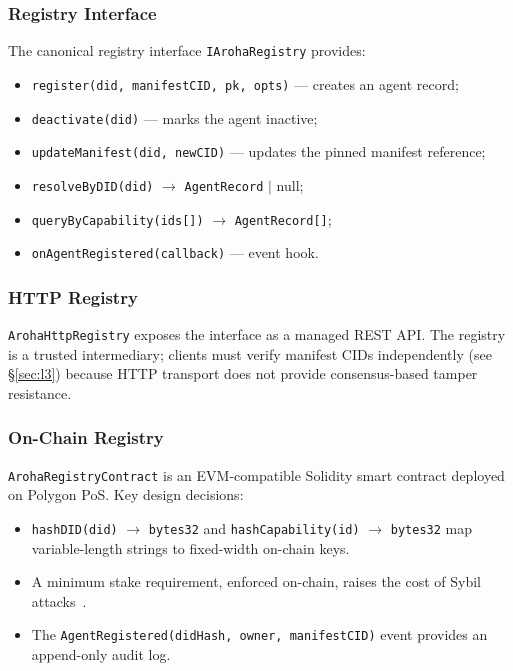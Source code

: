 \documentclass[conference]{IEEEtran}
\begin{document}
\subsubsection{Registry Interface}

The canonical registry interface \texttt{IArohaRegistry}
provides:
\begin{itemize}
  \item \texttt{register(did, manifestCID, pk, opts)} —
    creates an agent record;
  \item \texttt{deactivate(did)} — marks the agent inactive;
  \item \texttt{updateManifest(did, newCID)} — updates the
    pinned manifest reference;
  \item \texttt{resolveByDID(did)} $\to$ \texttt{AgentRecord}
    $\mid$ null;
  \item \texttt{queryByCapability(ids[])} $\to$
    \texttt{AgentRecord[]};
  \item \texttt{onAgentRegistered(callback)} — event hook.
\end{itemize}

\subsubsection{HTTP Registry}

\texttt{ArohaHttpRegistry} exposes the interface as a managed
REST API. The registry is a trusted intermediary; clients must
verify manifest CIDs independently (see \S\ref{sec:l3}) because
HTTP transport does not provide consensus-based tamper resistance.

\subsubsection{On-Chain Registry}

\texttt{ArohaRegistryContract} is an EVM-compatible Solidity
smart contract deployed on Polygon PoS. Key design decisions:

\begin{itemize}
  \item \texttt{hashDID(did)} $\to$ \texttt{bytes32} and
    \texttt{hashCapability(id)} $\to$ \texttt{bytes32} map
    variable-length strings to fixed-width on-chain keys.
  \item A minimum stake requirement, enforced on-chain, raises
    the cost of Sybil attacks~\cite{douceur2002sybil}.
  \item The \texttt{AgentRegistered(didHash, owner,
    manifestCID)} event provides an append-only audit log.
\end{itemize}
\end{document}
